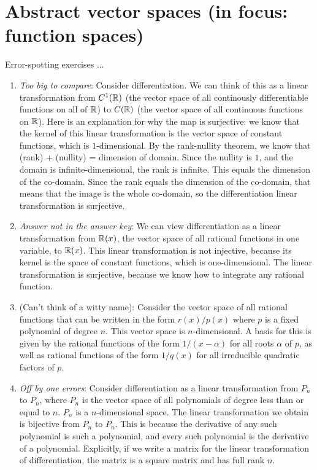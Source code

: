 \documentclass[10pt]{amsart}
\begin{document}
\section{Abstract vector spaces (in focus: function spaces)}

Error-spotting exercises ...

\begin{enumerate}
\item {\em Too big to compare}: Consider differentiation. We can think
  of this as a linear transformation from $C^1(\mathbb{R})$ (the vector space
  of all continously differentiable functions on all of $\mathbb{R}$) to
  $C(\mathbb{R})$ (the vector space of all continuous functions on $\mathbb{R}$). Here
  is an explanation for why the map is surjective: we know that the
  kernel of this linear transformation is the vector space of constant
  functions, which is $1$-dimensional. By the rank-nullity theorem, we
  know that (rank) + (nullity) = dimension of domain. Since the
  nullity is $1$, and the domain is infinite-dimensional, the rank is
  infinite. This equals the dimension of the co-domain. Since the rank
  equals the dimension of the co-domain, that means that the image is
  the whole co-domain, so the differentiation linear transformation is
  surjective.
\item {\em Answer not in the answer key}: We can view differentiation
  as a linear transformation from $\mathbb{R}(x)$, the vector space of all
  rational functions in one variable, to $\mathbb{R}(x)$. This linear
  transformation is not injective, because its kernel is the space of
  constant functions, which is one-dimensional. The linear
  transformation is surjective, because we know how to integrate any
  rational function.
\item (Can't think of a witty name): Consider the vector space of all
  rational functions that can be written in the form $r(x)/p(x)$ where
  $p$ is a fixed polynomial of degree $n$. This vector space is
  $n$-dimensional. A basis for this is given by the rational functions
  of the form $1/(x - \alpha)$ for all roots $\alpha$ of $p$, as well
  as rational functions of the form $1/q(x)$ for all irreducible
  quadratic factors of $p$.
\item {\em Off by one errors}: Consider differentiation as a linear
  transformation from $P_n$ to $P_n$, where $P_n$ is the vector space
  of all polynomials of degree less than or equal to $n$. $P_n$ is a
  $n$-dimensional space. The linear transformation we obtain is
  bijective from $P_n$ to $P_n$. This is because the derivative of any
  such polynomial is such a polynomial, and every such polynomial is
  the derivative of a polynomial. Explicitly, if we write a matrix for
  the linear transformation of differentiation, the matrix is a square
  matrix and has full rank $n$.
\end{enumerate}
\end{document}
